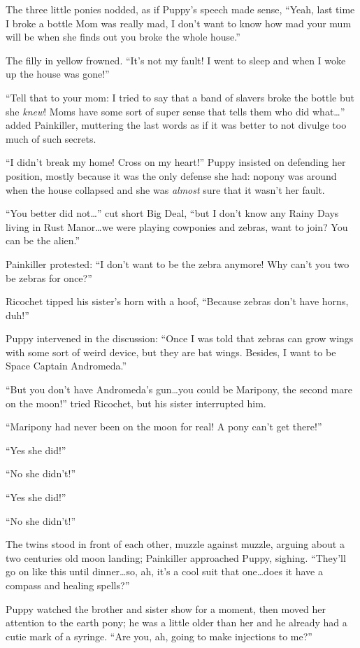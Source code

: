 The three little ponies nodded, as if Puppy's speech made sense, ``Yeah, last time I broke a bottle Mom was really mad, I don't want to know how mad your mum will be when she finds out you broke the whole house.''

The filly in yellow frowned. ``It's not my fault! I went to sleep and when I woke up the house was gone!''

``Tell that to your mom: I tried to say that a band of slavers broke the bottle but she \emph{knew}! Moms have some sort of super sense that tells them who did what\dots'' added Painkiller, muttering the last words as if it was better to not divulge too much of such secrets.

``I didn't break my home! Cross on my heart!'' Puppy insisted on defending her position, mostly because it was the only defense she had: nopony was around when the house collapsed and she was \emph{almost} sure that it wasn't her fault.

``You better did not\dots'' cut short Big Deal, ``but I don't know any Rainy Days living in Rust Manor\dots we were playing cowponies and zebras, want to join? You can be the alien.''

Painkiller protested: ``I don't want to be the zebra anymore! Why can't you two be zebras for once?''

Ricochet tipped his sister's horn with a hoof, ``Because zebras don't have horns, duh!''

Puppy intervened in the discussion: ``Once I was told that zebras can grow wings with some sort of weird device, but they are bat wings. Besides, I want to be Space Captain Andromeda.''

``But you don't have Andromeda's gun\dots you could be Maripony, the second mare on the moon!'' tried Ricochet, but his sister interrupted him.

``Maripony had never been on the moon for real! A pony can't get there!''

``Yes she did!''

``No she didn't!''

``Yes she did!''

``No she didn't!''

The twins stood in front of each other, muzzle against muzzle, arguing about a two centuries old moon landing; Painkiller approached Puppy, sighing. ``They'll go on like this until dinner\dots so, ah, it's a cool suit that one\dots does it have a compass and healing spells?''

Puppy watched the brother and sister show for a moment, then moved her attention to the earth pony; he was a little older than her and he already had a cutie mark of a syringe. ``Are you, ah, going to make injections to me?''

